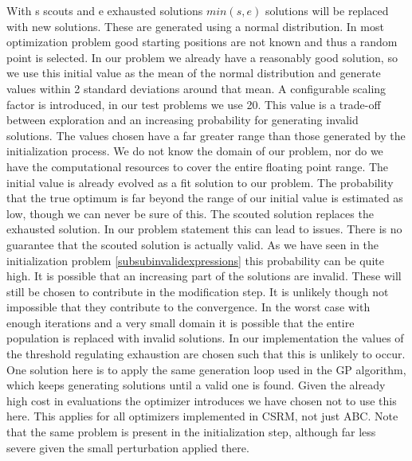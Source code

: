 With s scouts and e exhausted solutions $min(s, e)$ solutions will be replaced with new solutions. These are generated using a normal distribution. In most optimization problem good starting positions are not known and thus a random point is selected. In our problem we already have a reasonably good solution, so we use this initial value as the mean of the normal distribution and generate values within 2 standard deviations around that mean. A configurable scaling factor is introduced, in our test problems we use 20. This value is a trade-off between exploration and an increasing probability for generating invalid solutions. The values chosen have a far greater range than those generated by the initialization process. We do not know the domain of our problem, nor do we have the computational resources to cover the entire floating point range. The initial value is already evolved as a fit solution to our problem. The probability that the true optimum is far beyond the range of our initial value is estimated as low, though we can never be sure of this. The scouted solution replaces the exhausted solution. In our problem statement this can lead to issues. There is no guarantee that the scouted solution is actually valid. As we have seen in the initialization problem \ref{subsubinvalidexpressions} this probability can be quite high. It is possible that an increasing part of the solutions are invalid. These will still be chosen to contribute in the modification step. It is unlikely though not impossible that they contribute to the convergence. In the worst case with enough iterations and a very small domain it is possible that the entire population is replaced with invalid solutions. In our implementation the values of the threshold regulating exhaustion are chosen such that this is unlikely to occur. One solution here is to apply the same generation loop used in the GP algorithm, which keeps generating solutions until a valid one is found. Given the already high cost in evaluations the optimizer introduces we have chosen not to use this here. This applies for all optimizers implemented in CSRM, not just ABC. Note that the same problem is present in the initialization step, although far less severe given the small perturbation applied there.


